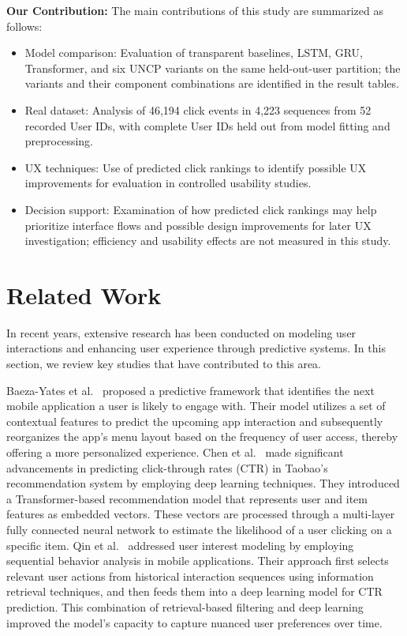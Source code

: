 \documentclass[sn-mathphys-num, Numbered]{sn-jnl}%
\theoremstyle{thmstyleone}%
\theoremstyle{thmstyletwo}%
\theoremstyle{thmstylethree}%
\begin{document}
\textbf{Our Contribution:}
The main contributions of this study are summarized as follows:
\begin{itemize}
	\item {Model comparison:} Evaluation of transparent baselines, LSTM, GRU, Transformer, and six UNCP variants on the same held-out-user partition; the variants and their component combinations are identified in the result tables.
	
	\item {Real dataset:} Analysis of 46{,}194 click events in 4{,}223 sequences from 52 recorded User IDs, with complete User IDs held out from model fitting and preprocessing.
	
	\item {UX techniques:} Use of predicted click rankings to identify possible UX improvements for evaluation in controlled usability studies.
	
	\item {Decision support:} Examination of how predicted click rankings may help prioritize interface flows and possible design improvements for later UX investigation; efficiency and usability effects are not measured in this study.
\end{itemize}




\section{ Related Work}

In recent years, extensive research has been conducted on modeling user interactions and enhancing user experience through predictive systems. In this section, we review key studies that have contributed to this area.





Baeza-Yates et al.~\cite{bohmer2011falling} proposed a predictive framework that identifies the next mobile application a user is likely to engage with. Their model utilizes a set of contextual features to predict the upcoming app interaction and subsequently reorganizes the app's menu layout based on the frequency of user access, thereby offering a more personalized experience.  Chen et al.~\cite{chen2019behavior} made significant advancements in predicting click-through rates (CTR) in Taobao's recommendation system by employing deep learning techniques. They introduced a Transformer-based recommendation model that represents user and item features as embedded vectors. These vectors are processed through a multi-layer fully connected neural network to estimate the likelihood of a user clicking on a specific item. Qin et al.~\cite{qin2020user} addressed user interest modeling by employing sequential behavior analysis in mobile applications. Their approach first selects relevant user actions from historical interaction sequences using information retrieval techniques, and then feeds them into a deep learning model for CTR prediction. This combination of retrieval-based filtering and deep learning improved the model's capacity to capture nuanced user preferences over time.
\end{document}

